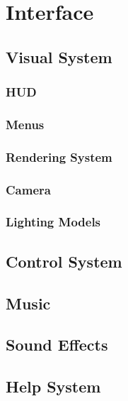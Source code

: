 \chapter{Interface}
\section{Visual System}
\subsection{HUD} %
\subsection{Menus} %
\subsection{Rendering System} %
\subsection{Camera} %
\subsection{Lighting Models} %
\section{Control System} %
\section{Music} %
\section{Sound Effects} %
\section{Help System} %

